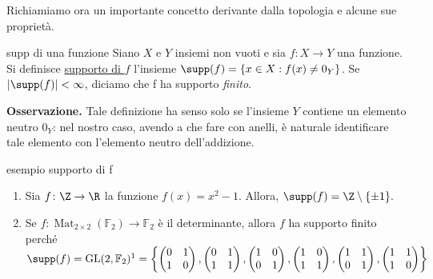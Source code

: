 \noindent Richiamiamo ora un importante concetto derivante dalla topologia e alcune sue proprietà.

\begin{defn}{supp di una funzione}
  Siano $X$ e $Y$ insiemi non vuoti e sia $f\colon X\to Y$ una funzione. Si definisce \underline{supporto di $f$} l'insieme 
  $\supp(f)=\left\{x\in X: f(x)\neq 0_Y \right\}$. Se $|\supp(f)|<\infty$, diciamo che f ha supporto \emph{finito}.
\end{defn}

\noindent \textbf{Osservazione.} Tale definizione ha senso solo se 
l'insieme $Y$ contiene un elemento neutro $0_Y$: nel nostro caso, avendo a che fare con anelli, 
è naturale identificare tale elemento con l'elemento neutro dell'addizione.

\begin{example}[]{esempio supporto di f}
  \begin{enumerate}
  \item Sia $f\colon \Z\to\R$ la funzione $f(x)=x^2-1$. Allora, $\supp(f)=\Z\setminus\{\pm 1\}.$
  \item Se $f\colon \operatorname{Mat}_{2\times 2}(\mathbb{F}_2)\to \mathbb{F}_2$ è il determinante, 
  allora $f$ ha supporto finito perché $\supp(f)=\mathrm{GL}(2,\mathbb{F}_2)\footnotemark = 
  \left\{ 
    \begin{pmatrix} 0 & 1 \\ 1 & 0 \end{pmatrix}, 
    \begin{pmatrix} 0 & 1 \\ 1 & 1 \end{pmatrix}, 
    \begin{pmatrix} 1 & 0 \\ 0 & 1 \end{pmatrix}, 
    \begin{pmatrix} 1 & 0 \\ 1 & 1 \end{pmatrix}, 
    \begin{pmatrix} 1 & 1 \\ 0 & 1 \end{pmatrix}, 
    \begin{pmatrix} 1 & 1 \\ 1 & 0 \end{pmatrix} \right\} $
  \end{enumerate}
\end{example}


